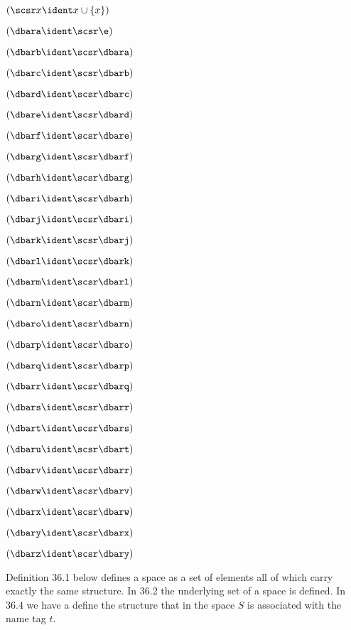 \vskip 2pt

 $(\scsr x \ident x \cup \{x\})$

 $(\dbara \ident \scsr \e)$

 $(\dbarb\ident \scsr \dbara)$

 $(\dbarc\ident \scsr \dbarb)$

 $(\dbard\ident \scsr \dbarc)$

 $(\dbare\ident \scsr \dbard)$

 $(\dbarf\ident \scsr \dbare)$

 $(\dbarg\ident \scsr \dbarf)$

 $(\dbarh\ident \scsr \dbarg)$

 $(\dbari\ident \scsr \dbarh)$

 $(\dbarj\ident \scsr \dbari)$

 $(\dbark\ident \scsr \dbarj)$

 $(\dbarl\ident \scsr \dbark)$

 $(\dbarm\ident \scsr \dbarl)$

 $(\dbarn\ident \scsr \dbarm)$

 $(\dbaro\ident \scsr \dbarn)$

 $(\dbarp\ident \scsr \dbaro)$

 $(\dbarq\ident \scsr \dbarp)$

 $(\dbarr\ident \scsr \dbarq)$

 $(\dbars\ident \scsr \dbarr)$

 $(\dbart\ident \scsr \dbars)$

 $(\dbaru\ident \scsr \dbart)$

 $(\dbarv\ident \scsr \dbarr)$

 $(\dbarw\ident \scsr \dbarv)$

 $(\dbarx\ident \scsr \dbarw)$

 $(\dbary\ident \scsr \dbarx)$

 $(\dbarz\ident \scsr \dbary)$
\lineb

\lineb

Definition 36.1 below defines a space as a set of elements all of
which carry exactly the same structure.  In 36.2 the underlying set
of a space is defined.  In 36.4 we have a define the structure that 
in the space $S$ is associated with the name tag $t$. 

